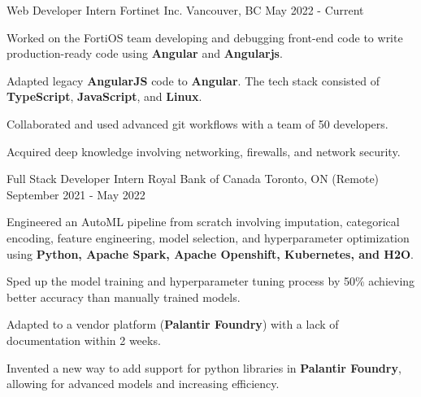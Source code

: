 

\begin{cventries}

	\cventry
	{Web Developer Intern} %
	{Fortinet Inc.} %
	{Vancouver, BC} %
	{May 2022 - Current} %
	{
		\begin{cvitems} %
			\item {Worked on the FortiOS team developing and debugging front-end code to write production-ready code using \textbf{Angular} and \textbf{Angularjs}.}
			\item {Adapted legacy \textbf{AngularJS} code to \textbf{Angular}. The tech stack consisted of \textbf{TypeScript}, \textbf{JavaScript}, and \textbf{Linux}.}
			\item {Collaborated and used advanced git workflows with a team of 50 developers.}
			\item {Acquired deep knowledge involving networking, firewalls, and network security.}
		\end{cvitems}
	}

	\cventry
	{Full Stack Developer Intern} %
	{Royal Bank of Canada} %
	{Toronto, ON (Remote)} %
	{September 2021 - May 2022} %
	{
		\begin{cvitems} %
			\item {Engineered an AutoML pipeline from scratch involving imputation, categorical encoding, feature engineering, model selection, and hyperparameter optimization using \textbf{Python, Apache Spark, Apache Openshift, Kubernetes, and H2O}.}
			\item {Sped up the model training and hyperparameter tuning process by 50\% achieving better accuracy than manually trained models.}
			\item {Adapted to a vendor platform (\textbf{Palantir Foundry}) with a lack of documentation within 2 weeks.}
			\item {Invented a new way to add support for python libraries in \textbf{Palantir Foundry}, allowing for advanced models and increasing efficiency.}
		\end{cvitems}
	}


\end{cventries}

